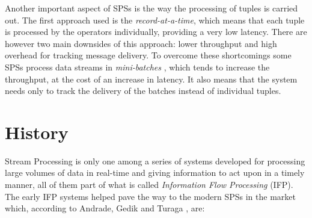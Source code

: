 \documentclass[ppgc,diss,english]{iiufrgs}
\begin{document}
Another important aspect of SPSs is the way the processing of tuples is carried out. The first approach used is the \emph{record-at-a-time}, which means that each tuple is processed by the operators individually, providing a very low latency. There are however two main downsides of this approach: lower throughput and high overhead for tracking message delivery. To overcome these shortcomings some SPSs process data streams in \emph{mini-batches} \cite{muralidharan2014fault}, which tends to increase the throughput, at the cost of an increase in latency. It also means that the system needs only to track the delivery of the batches instead of individual tuples.


\section{History}
\label{sec:esp:history}

Stream Processing is only one among a series of systems developed for processing large volumes of data in real-time and giving information to act upon in a timely manner, all of them part of what is called \emph{Information Flow Processing} (IFP). The early IFP systems helped pave the way to the modern SPSs in the market which, according to Andrade, Gedik and Turaga \cite{andrade2014fundamentals}, are: 

\end{document}
